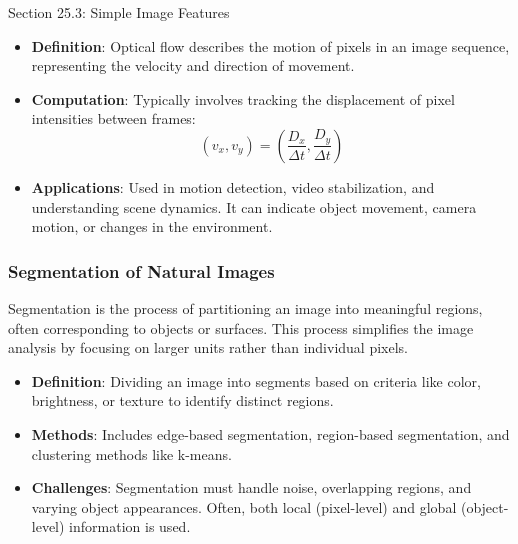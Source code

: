 \begin{notes}{Section 25.3: Simple Image Features}
\begin{highlight}
        \begin{itemize}
            \item \textbf{Definition}: Optical flow describes the motion of pixels in an image sequence, representing the velocity and direction of movement.
            \item \textbf{Computation}: Typically involves tracking the displacement of pixel intensities between frames:
            \[
            (v_x, v_y) = \left(\frac{D_x}{\Delta t}, \frac{D_y}{\Delta t}\right)
            \]
            \item \textbf{Applications}: Used in motion detection, video stabilization, and understanding scene dynamics. It can indicate object movement, camera motion, or changes in the environment.
        \end{itemize}
    
    \end{highlight}
    
    \subsubsection*{Segmentation of Natural Images}
    
    Segmentation is the process of partitioning an image into meaningful regions, often corresponding to objects or surfaces. This process simplifies the image analysis by focusing on larger units rather than individual pixels.
    
    \begin{highlight}
    
        \begin{itemize}
            \item \textbf{Definition}: Dividing an image into segments based on criteria like color, brightness, or texture to identify distinct regions.
            \item \textbf{Methods}: Includes edge-based segmentation, region-based segmentation, and clustering methods like k-means.
            \item \textbf{Challenges}: Segmentation must handle noise, overlapping regions, and varying object appearances. Often, both local (pixel-level) and global (object-level) information is used.
        \end{itemize}
    
    \end{highlight}
    
    \begin{highlight}
    

\end{highlight}
\end{notes}
